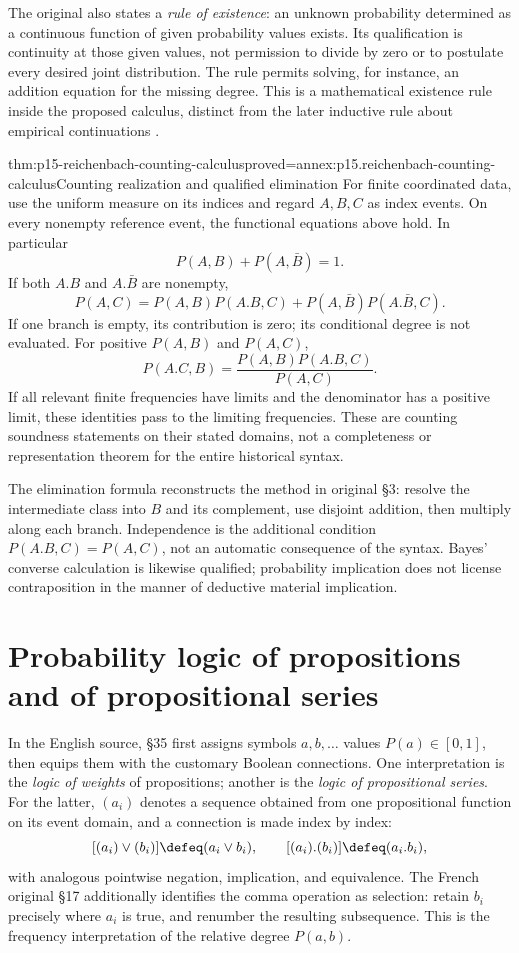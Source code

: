 The original also states a \emph{rule of existence}: an unknown
probability determined as a continuous function of given probability
values exists. Its qualification is continuity at those given values,
not permission to divide by zero or to postulate every desired joint
distribution. The rule permits solving, for instance, an addition
equation for the missing degree. This is a mathematical existence
rule inside the proposed calculus, distinct from the later inductive
rule about empirical continuations
\cite[pp.~279--283 and286--288]{Reichenbach1937Fondements}.

\begin{hbtheorem}{thm:p15-reichenbach-counting-calculus}{proved=annex:p15.reichenbach-counting-calculus}{Counting realization and qualified elimination}
For finite coordinated data, use the uniform measure on its indices
and regard \(A,B,C\) as index events. On every nonempty reference
event, the functional equations above hold. In particular
\[
 P(A,B)+P(A,\bar B)=1.
\]
If both \(A.B\) and \(A.\bar B\) are nonempty,
\[
 P(A,C)=P(A,B)P(A.B,C)+P(A,\bar B)P(A.\bar B,C).
\]
If one branch is empty, its contribution is zero; its conditional
degree is not evaluated. For positive \(P(A,B)\) and \(P(A,C)\),
\[
 P(A.C,B)=\frac{P(A,B)P(A.B,C)}{P(A,C)}.
\]
If all relevant finite frequencies have limits and the denominator
has a positive limit, these identities pass to the limiting
frequencies. These are counting soundness statements on their stated
domains, not a completeness or representation theorem for the entire
historical syntax.
\end{hbtheorem}

The elimination formula reconstructs the method in original §3:
resolve the intermediate class into \(B\) and its complement,
use disjoint addition, then multiply along each branch. Independence
is the additional condition \(P(A.B,C)=P(A,C)\), not an automatic
consequence of the syntax. Bayes' converse calculation is likewise
qualified; probability implication does not license contraposition
in the manner of deductive material implication.

\section{Probability logic of propositions and of propositional series}
\label{sec:p15-reichenbach-series-logic}

In the English source, §35 first assigns symbols \(a,b,\ldots\)
values \(P(a)\in[0,1]\), then equips them with the customary
Boolean connections. One interpretation is the \emph{logic of weights}
of propositions; another is the \emph{logic of propositional series}.
For the latter, \((a_i)\) denotes a sequence obtained from one
propositional function on its event domain, and a connection is made
index by index:
\[
 [(a_i)\lor(b_i)]\defeq(a_i\lor b_i),\qquad
 [(a_i).(b_i)]\defeq(a_i.b_i),
\]
with analogous pointwise negation, implication, and equivalence.
The French original §17 additionally identifies the comma operation
as selection: retain \(b_i\) precisely where \(a_i\) is true,
and renumber the resulting subsequence. This is the frequency
interpretation of the relative degree \(P(a,b)\).

